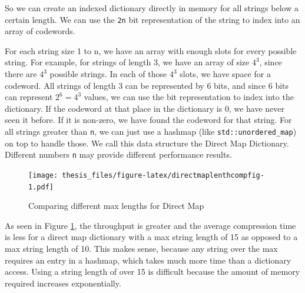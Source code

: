 \documentclass[12pt,twoside]{reedthesis}
\begin{document}
So we can create an indexed dictionary directly in memory for all strings below a certain length. We can use the \texttt{2n} bit representation of the string
to index into an array of codewords.

For each string size 1 to n, we have an array with enough slots for every possible string. For example, for strings of length 3, we have an array of size \(4^3\), since there are \(4^3\) possible strings. In each of those \(4^3\) slots, we have space for a codeword. All strings of length 3 can be represented by 6 bits, and since 6 bits can represent \(2^6=4^3\) values, we can use the bit representation to index into the dictionary. If the codeword at that place in the dictionary is 0, we have never seen it before. If it is non-zero, we have found the codeword for that string. For all strings greater than \texttt{n}, we can just use a hashmap (like \texttt{std::unordered\_map}) on top to handle those. We call this data structure the Direct Map Dictionary. Different numbers \texttt{n} may provide different performance results.
\begin{figure}
\centering
\texttt{[image: thesis\_files/figure-latex/directmaplenthcompfig-1.pdf]}
\caption{\label{fig:directmaplenthcompfig}Comparing different max lengths for Direct Map}
\end{figure}
As seen in Figure \ref{fig:directmaplenthcompfig}, the throughput is greater and the average compression time is less for a direct map dictionary with a max string length of 15 as opposed to a max string length of 10. This makes sense, because any string over the max requires an entry in a hashmap, which takes much more time than a dictionary access. Using a string length of over 15 is difficult because the amount of memory required increases exponentially.
\end{document}
